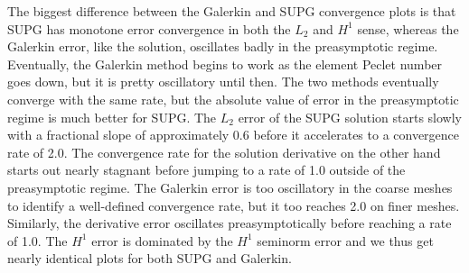 \documentclass[12pt]{article}
\begin{document}
The biggest difference between the Galerkin and SUPG convergence plots is that
SUPG has monotone error convergence in both the $L_2$ and $H^1$ sense, whereas
the Galerkin error, like the solution, oscillates badly in the preasymptotic
regime. Eventually, the Galerkin method begins to work as the element Peclet
number goes down, but it is pretty oscillatory until then. The two methods
eventually converge with the same rate, but the absolute value of error in the
preasymptotic regime is much better for SUPG. The $L_2$ error of the SUPG
solution starts slowly with a fractional slope of approximately 0.6 before it
accelerates to a  convergence rate of 2.0. The convergence rate for the
solution derivative on the other hand starts out nearly stagnant before
jumping to a rate of 1.0 outside of the preasymptotic regime. The Galerkin error is too
oscillatory in the coarse meshes to identify a well-defined convergence rate,
but it too reaches 2.0 on finer meshes. Similarly, the derivative error
oscillates preasymptotically before reaching a rate of 1.0. The $H^1$ error is
dominated by the $H^1$ seminorm error and we thus get nearly identical plots
for both SUPG and Galerkin.

\clearpage

\end{document}
